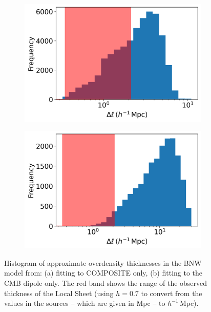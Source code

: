 \documentclass[a4paper,12pt]{report}
\begin{document}
\begin{figure}[t]
    \centering
    \begin{subfigure}{0.45\textwidth}
        \centering
        \includegraphics[width=\textwidth]{BNW Model MCMC/Distribution of overdensity thickness.png}
        \caption{}
    \end{subfigure}
    \begin{subfigure}{0.45\textwidth}
        \centering
        \includegraphics[width=\textwidth]{BNW Model MCMC/Distribution of overdensity thickness CMB.png}
        \caption{}
    \end{subfigure}
    \caption{Histogram of approximate overdensity thicknesses in the BNW model from: (a) fitting to COMPOSITE only, (b) fitting to the CMB dipole only. The red band shows the range of the observed thickness of the Local Sheet \cite{RN74,RN240} (using $h=0.7$ to convert from the values in the sources -- which are given in Mpc -- to $h^{-1}\,$Mpc).}
    \label{fig: BNW model overdensity thickness}
\end{figure}
\end{document}
